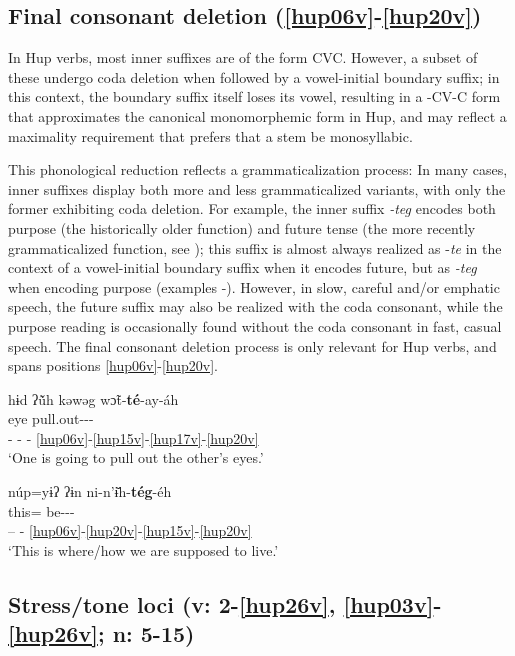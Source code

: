 \documentclass[output=paper]{langscibook}
\begin{document}
\subsection{Final consonant deletion (\ref{hup06v}-\ref{hup20v})} \label{sec:hup:key:5.4}

In Hup verbs, most inner suffixes are of the form CVC. However, a subset of these undergo coda deletion when followed by a vowel-initial boundary suffix; in this context, the boundary suffix itself loses its vowel, resulting in a -CV-C form that approximates the canonical monomorphemic form in Hup, and may reflect a maximality requirement that prefers that a stem be monosyllabic. 

This phonological reduction reflects a grammaticalization process: In many cases, inner suffixes display both more and less grammaticalized variants, with only the former exhibiting coda deletion. For example, the inner suffix \textit{{}-teg} encodes both purpose (the historically older function) and future tense (the more recently grammaticalized function, see \citealt{Epps2008b}); this suffix is almost always realized as -\textit{te} in the context of a vowel-initial boundary suffix when it encodes future, but as \textit{{}-teg} when encoding purpose (examples -). However, in slow, careful and/or emphatic speech, the future suffix may also be realized with the coda consonant, while the purpose reading is occasionally found without the coda consonant in fast, casual speech. The final consonant deletion process is only relevant for Hup verbs, and spans positions \ref{hup06v}-\ref{hup20v}.

\ea\label{ex:hup:key:32}
\glll hɨd ʔũ̌h kǝwǝg wɔ̃t-\textbf{té}-ay-áh\\ 
\Third\Pl{} \Intrc{} eye pull.out-\Fut-\Inch-\Decl{}\\
-  -  -  \ref{hup06v}-\ref{hup15v}-\ref{hup17v}-\ref{hup20v} \\
\glt `One is going to pull out the other's eyes.'
\z 


\ea\label{ex:hup:key:33} 
\glll núp=yɨʔ ʔɨn ni-n'ɨ̌h-\textbf{tég}-éh\\ 
this=\Adv{} \First\Pl{} be-\Nmlz-\Purp{}-\Decl{}\\ 
--  -  \ref{hup06v}-\ref{hup20v}-\ref{hup15v}-\ref{hup20v} \\
\glt `This is where/how we are supposed to live.'
\z 


\subsection{Stress/tone loci (v: 2-\ref{hup26v}, \ref{hup03v}-\ref{hup26v}; n: 5-15)} 
\label{sec:hup:key:5.5}
\end{document}
